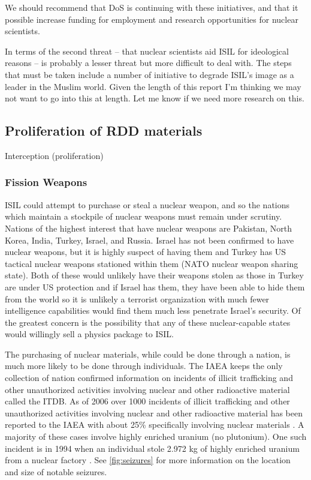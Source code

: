 \documentclass{report}
\begin{document}
We should recommend that DoS is continuing with these initiatives, and that it possible increase funding for employment and research opportunities for nuclear scientists.

In terms of the second threat – that nuclear scientists aid ISIL for ideological reasons – is probably a lesser threat but more difficult to deal with. The steps that must be taken include a number of initiative to degrade ISIL's image as a leader in the Muslim world. Given the length of this report I'm thinking we may not want to go into this at length. Let me know if we need more research on this. 

\subsection{Proliferation of RDD materials}

Interception (proliferation)
 
\subsubsection{Fission Weapons}

ISIL could attempt to purchase or steal a nuclear weapon, and so the nations which maintain a stockpile of nuclear weapons must remain under scrutiny. Nations of the highest interest that have nuclear weapons are Pakistan, North Korea, India, Turkey, Israel, and Russia. Israel has not been confirmed to have nuclear weapons, but it is highly suspect of having them and Turkey has US tactical nuclear weapons stationed within them (NATO nuclear weapon sharing state). Both of these would unlikely have their weapons stolen as those in Turkey are under US protection and if Israel has them, they have been able to hide them from the world so it is unlikely a terrorist organization with much fewer intelligence capabilities would find them much less penetrate Israel’s security. Of the greatest concern is the possibility that any of these nuclear-capable states would willingly sell a physics package to ISIL.

The purchasing of nuclear materials, while could be done through a nation, is much more likely to be done through individuals. The IAEA keeps the only collection of nation confirmed information on incidents of illicit trafficking and other unauthorized activities involving nuclear and other radioactive material called the ITDB. As of 2006 over 1000 incidents of illicit trafficking and other unauthorized activities involving nuclear and other radioactive material has been reported to the IAEA with about 25\% specifically involving nuclear materials \cite{Iaea2007}. A majority of these cases involve highly enriched uranium (no plutonium). One such incident is in 1994 when an individual stole 2.972 kg of highly enriched uranium from a nuclear factory \cite{Iaea2007}. See \autoref{fig:seizures} for more information on the location and size of notable seizures. 
\end{document}
